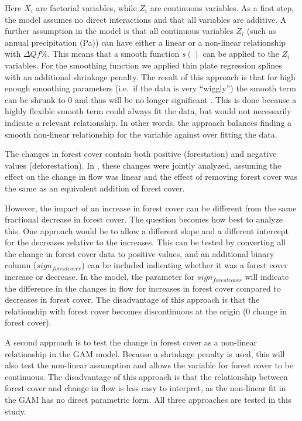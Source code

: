 \documentclass[]{elsarticle} %
\begin{document}
Here \(X_i\) are factorial variables, while \(Z_i\) are continuous variables. As a first step, the model assumes no direct interactions and that all variables are additive. A further assumption in the model is that all continuous variables \(Z_i\) (such as annual precipitation (Pa)) can have either a linear or a non-linear relationship with \(\Delta Qf \%\). This means that a smooth function \(s()\) can be applied to the \(Z_i\) variables. For the smoothing function we applied thin plate regression splines with an additional shrinkage penalty. The result of this approach is that for high enough smoothing parameters (i.e.~if the data is very ``wiggly'') the smooth term can be shrunk to 0 and thus will be no longer significant \citep{wood2006}. This is done because a highly flexible smooth term could always fit the data, but would not necessarily indicate a relevant relationship. In other words, the approach balances finding a smooth non-linear relationship for the variable against over fitting the data.

The changes in forest cover contain both positive (forestation) and negative values (deforestation). In \citet{zhang2017}, these changes were jointly analyzed, assuming the effect on the change in flow was linear and the effect of removing forest cover was the same as an equivalent addition of forest cover.

However, the impact of an increase in forest cover can be different from the same fractional decrease in forest cover. The question becomes how best to analyze this. One approach would be to allow a different slope and a different intercept for the decreases relative to the increases.
This can be tested by converting all the change in forest cover data to positive values, and an additional binary column (\(sign_{forest cover}\)) can be included indicating whether it was a forest cover increase or decrease. In the model, the parameter for \(sign_{forest cover}\) will indicate the difference in the changes in flow for increases in forest cover compared to decreases in forest cover. The disadvantage of this approach is that the relationship with forest cover becomes discontinuous at the origin (0 change in forest cover).

A second approach is to test the change in forest cover as a non-linear relationship in the GAM model. Because a shrinkage penalty is used, this will also test the non-linear assumption and allows the variable for forest cover to be continuous. The disadvantage of this approach is that the relationship between forest cover and change in flow is less easy to interpret, as the non-linear fit in the GAM has no direct parametric form.
All three approaches are tested in this study.
\end{document}
